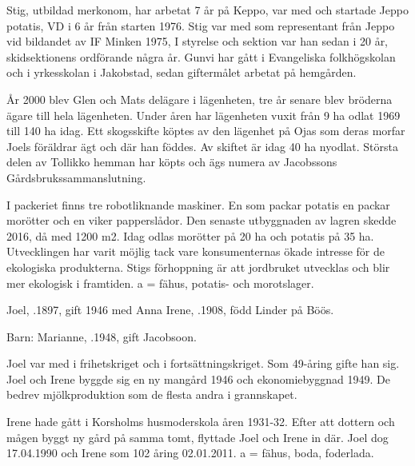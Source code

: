Stig, utbildad merkonom, har arbetat 7 år på Keppo, var med och startade Jeppo potatis, VD i 6 år från starten 1976. Stig var med som representant från Jeppo vid bildandet av IF Minken 1975, I styrelse och sektion var han sedan i 20 år, skidsektionens ordförande några år. Gunvi har gått i Evangeliska folkhögskolan och i yrkesskolan i Jakobstad, sedan giftermålet arbetat på hemgården.

År 2000 blev Glen och Mats delägare i lägenheten, tre år senare blev bröderna ägare till hela lägenheten. Under åren har lägenheten vuxit från 9 ha odlat 1969 till 140 ha idag. Ett skogsskifte köptes av den lägenhet på Ojas som deras morfar Joels föräldrar ägt och där han föddes. Av skiftet är idag 40 ha nyodlat. Största delen av Tollikko hemman har köpts och ägs numera av Jacobssons 	Gårdsbrukssammanslutning.

I packeriet finns tre robotliknande maskiner. En som packar potatis en packar morötter och en viker papperslådor. Den senaste utbyggnaden av lagren skedde 2016, då med 1200 m2. Idag odlas morötter på 20 ha och potatis på 35 ha. Utvecklingen har varit möjlig tack vare konsumenternas ökade intresse för de ekologiska produkterna. Stigs förhoppning är att jordbruket utvecklas och blir mer ekologisk i framtiden. a = fähus, potatis- och morotslager.





Joel, .1897, gift 1946 med Anna Irene, .1908, född Linder på Böös.

Barn:  Marianne, .1948,  gift Jacobsoon.

Joel var med i frihetskriget och i fortsättningskriget. Som 49-åring gifte han sig. Joel och Irene byggde sig en ny mangård 1946 och ekonomiebyggnad 1949. De bedrev mjölkproduktion som de flesta andra i grannskapet.

Irene hade gått i Korsholms husmoderskola åren 1931-32. Efter att dottern och mågen byggt ny gård på samma tomt, flyttade Joel och Irene in där. Joel dog 17.04.1990 och Irene som 102 åring 02.01.2011. a = fähus, boda, foderlada.






